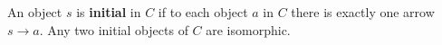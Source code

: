 An object $s$ is \textbf{initial} in $C$ if to each object $a$ in $C$ there is exactly one arrow $s \rightarrow a$. Any two initial objects of $C$ are isomorphic.